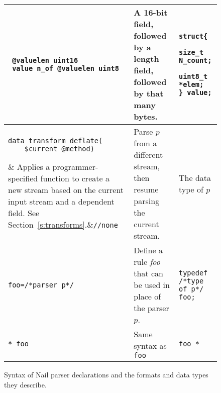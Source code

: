 \begin{figure*}
\begin{tabular}{@{}p{5cm}p{6cm}p{5cm}@{}}
\begin{minipage}{5cm}
\begin{verbatim}
 @valuelen uint16
 value n_of @valuelen uint8
\end{verbatim}
\end{minipage}
&
\begin{minipage}{6cm}
A 16-bit field, followed by a length field, followed by that many bytes.
\end{minipage}
&
\begin{minipage}{5cm}
\begin{lstlisting}
struct{ 
    size_t N_count;
    uint8_t *elem;
} value;
\end{lstlisting}
\end{minipage}
\\\hline
\begin{minipage}{5cm}
\vspace{0.5em}
\begin{verbatim}
data transform deflate(
    $current @method)
\end{verbatim}
\end{minipage}
&
Applies a programmer-specified function to create a new stream based on the current input stream and
a dependent field. See
Section~\ref{s:transforms}.&\lstinline+//none+ \\\hline
\verb+apply $stream many +\textsl{p}\textit{/*parser*/}&  Parse $p$ from a different stream, then
resume parsing the current stream.& The data type of $p$ \\\hline
\verb+foo=/*parser p*/+ & Define a rule \textit{foo} that can be used in place of the parser $p$. & 
\lstinline+typedef /*type of p*/ foo;+\\\hline
\verb+* foo+ & Same syntax as \texttt{foo} & \lstinline+foo *+\\\hline
\bottomrule
\end{tabular}

\caption{Syntax of Nail parser declarations and the formats and data types they describe.}
\label{fig:syntax}
\end{figure*}